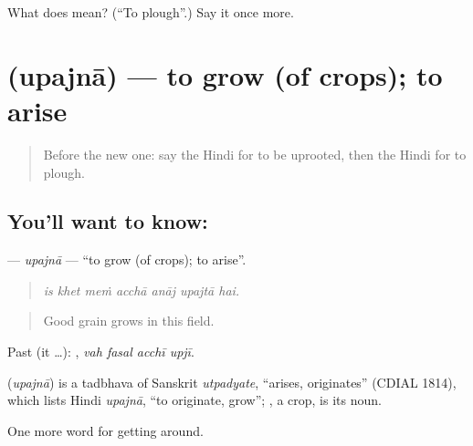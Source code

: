\begin{tcolorbox}[breakable,colback=teal!4,colframe=teal!35!black,title={Before you move on}]
What does  mean? (\textquotedblleft{}To plough\textquotedblright{}.) Say it once more.
\end{tcolorbox}
\section[\texorpdfstring{\hi{उपजना} (upajnā)}{उपजना (upajnā)}]{ (upajnā) — to grow (of crops); to arise}

\label{lesson:HI-C450-upajna}



\begin{quote}
Before the new one: say the Hindi for to be uprooted, then the Hindi for to plough.
\end{quote}

\subsection*{You'll want to know: }
\textbf{} — \emph{upajnā} — \textquotedblleft{}to grow (of crops); to arise\textquotedblright{}.

\begin{quote}
      
\end{quote}

\begin{quote}
\emph{is khet meṁ acchā anāj upajtā hai.}
\end{quote}

\begin{quote}
Good grain grows in this field.
\end{quote}

Past (it …):    , \emph{vah fasal acchī upjī}.

\begin{cousinweb}
\textbf{} (\emph{upajnā}) is a tadbhava of Sanskrit \emph{utpadyate}, \textquotedblleft{}arises, originates\textquotedblright{} (CDIAL 1814), which lists Hindi \emph{upajnā}, \textquotedblleft{}to originate, grow\textquotedblright{}; , a crop, is its noun.
\end{cousinweb}

\begin{grammarlens}[title={What you've built}]
One more word for getting around.
\end{grammarlens}

